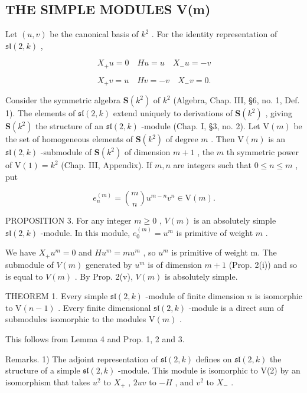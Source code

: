 \subsection{THE SIMPLE MODULES V(m)}

Let \((u,v)\) be the canonical basis of \(k^2\) . For the identity representation of \(\mathfrak{sl}(2,k)\) ,

\[
X _ {+} u = 0 \quad H u = u \quad X _ {-} u = - v
\]

\[
X _ {+} v = u \quad H v = - v \quad X _ {-} v = 0.
\]

Consider the symmetric algebra \(\mathbf{S}(k^2)\) of \(k^2\) (Algebra, Chap. III, §6, no. 1, Def. 1). The elements of \(\mathfrak{sl}(2,k)\) extend uniquely to derivations of \(\mathbf{S}(k^2)\) , giving \(\mathbf{S}(k^2)\) the structure of an \(\mathfrak{sl}(2,k)\) -module (Chap. I, §3, no. 2). Let \(\mathrm{V}(m)\) be the set of homogeneous elements of \(\mathbf{S}(k^2)\) of degree \(m\) . Then \(\mathrm{V}(m)\) is an \(\mathfrak{sl}(2,k)\) -submodule of \(\mathbf{S}(k^2)\) of dimension \(m + 1\) , the \(m\) th symmetric power of \(\mathrm{V}(1) = k^2\) (Chap. III, Appendix). If \(m,n\) are integers such that \(0 \leq n \leq m\) , put

\[
e _ {n} ^ {(m)} = \binom {m} {n} u ^ {m - n} v ^ {n} \in \mathrm{V} (m).
\]

PROPOSITION 3. For any integer \(m \geq 0\) , \(V(m)\) is an absolutely simple \(\mathfrak{sl}(2, k)\) -module. In this module, \(e_0^{(m)} = u^m\) is primitive of weight \(m\) .

We have \(X_{+}u^{m}=0\) and \(Hu^{m}=mu^{m}\) , so \(u^{m}\) is primitive of weight m. The submodule of \(V(m)\) generated by \(u^{m}\) is of dimension \(m+1\) (Prop. 2(i)) and so is equal to \(V(m)\) . By Prop. 2(v), \(V(m)\) is absolutely simple.

THEOREM 1. Every simple \(\mathfrak{sl}(2,k)\) -module of finite dimension \(n\) is isomorphic to \(\mathrm{V}(n - 1)\) . Every finite dimensional \(\mathfrak{sl}(2,k)\) -module is a direct sum of submodules isomorphic to the modules \(\mathrm{V}(m)\) .

This follows from Lemma 4 and Prop. 1, 2 and 3.

Remarks. 1) The adjoint representation of \(\mathfrak{sl}(2,k)\) defines on \(\mathfrak{sl}(2,k)\) the structure of a simple \(\mathfrak{sl}(2,k)\) -module. This module is isomorphic to V(2) by an isomorphism that takes \(u^2\) to \(X_+\) , \(2uv\) to \(-H\) , and \(v^2\) to \(X_-\) .

